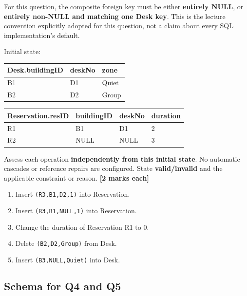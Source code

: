 For this question, the composite foreign key must be either \textbf{entirely NULL}, or \textbf{entirely non-NULL and matching one Desk key}. This is the lecture convention explicitly adopted for this question, not a claim about every SQL implementation's default.

Initial state:

\begin{longtable}[]{@{}lll@{}}
\toprule\noalign{}
Desk.buildingID & deskNo & zone \\
\midrule\noalign{}
\endhead
\bottomrule\noalign{}
\endlastfoot
B1 & D1 & Quiet \\
B2 & D2 & Group \\
\end{longtable}

\begin{longtable}[]{@{}llll@{}}
\toprule\noalign{}
Reservation.resID & buildingID & deskNo & duration \\
\midrule\noalign{}
\endhead
\bottomrule\noalign{}
\endlastfoot
R1 & B1 & D1 & 2 \\
R2 & NULL & NULL & 3 \\
\end{longtable}

Assess each operation \textbf{independently from this initial state}. No automatic cascades or reference repairs are configured. State \textbf{valid/invalid} and the applicable constraint or reason. \textbf{{[}2 marks each{]}}

\begin{enumerate}
\def\labelenumi{\arabic{enumi}.}
\tightlist
\item
  Insert \texttt{(\allowbreak{}R3,\allowbreak{}B1,\allowbreak{}D2,\allowbreak{}1)\allowbreak{}} into Reservation.
\item
  Insert \texttt{(\allowbreak{}R3,\allowbreak{}B1,\allowbreak{}NULL,\allowbreak{}1)\allowbreak{}} into Reservation.
\item
  Change the duration of Reservation R1 to 0.
\item
  Delete \texttt{(B2,D2,\textquotesingle{}Group\textquotesingle{})} from Desk.
\item
  Insert \texttt{(B3,NULL,\textquotesingle{}Quiet\textquotesingle{})} into Desk.
\end{enumerate}

\subsection{Schema for Q4 and Q5}\label{practice_paper_2-schema-for-q4-and-q5}

